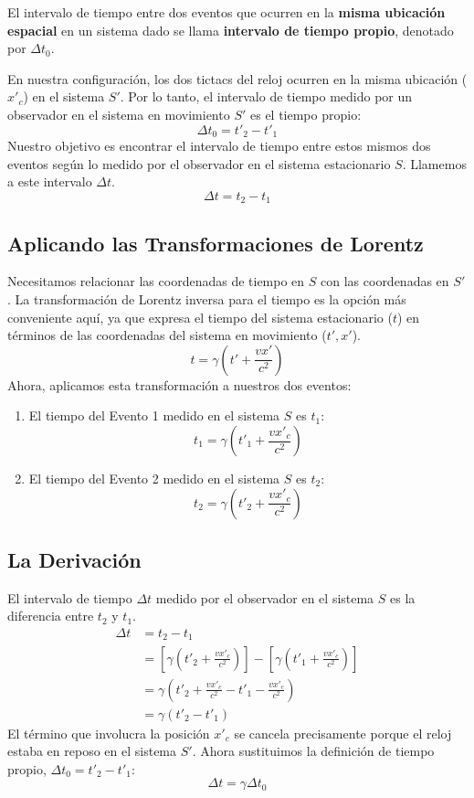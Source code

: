 \documentclass[11pt,a4paper]{article}
\begin{document}
El intervalo de tiempo entre dos eventos que ocurren en la \textbf{misma ubicación espacial} en un sistema dado se llama \textbf{intervalo de tiempo propio}, denotado por $\Delta t_0$.

En nuestra configuración, los dos tictacs del reloj ocurren en la misma ubicación ($x'_c$) en el sistema $S'$. Por lo tanto, el intervalo de tiempo medido por un observador en el sistema en movimiento $S'$ es el tiempo propio:
\[ \Delta t_0 = t'_2 - t'_1 \]
Nuestro objetivo es encontrar el intervalo de tiempo entre estos mismos dos eventos según lo medido por el observador en el sistema estacionario $S$. Llamemos a este intervalo $\Delta t$.
\[ \Delta t = t_2 - t_1 \]

\subsection{Aplicando las Transformaciones de Lorentz}

Necesitamos relacionar las coordenadas de tiempo en $S$ con las coordenadas en $S'$. La transformación de Lorentz inversa para el tiempo es la opción más conveniente aquí, ya que expresa el tiempo del sistema estacionario ($t$) en términos de las coordenadas del sistema en movimiento ($t', x'$).
\[ t = \gamma \left( t' + \frac{vx'}{c^2} \right) \]
Ahora, aplicamos esta transformación a nuestros dos eventos:
\begin{enumerate}
    \item El tiempo del Evento 1 medido en el sistema $S$ es $t_1$:
    \[ t_1 = \gamma \left( t'_1 + \frac{vx'_c}{c^2} \right) \]
    \item El tiempo del Evento 2 medido en el sistema $S$ es $t_2$:
    \[ t_2 = \gamma \left( t'_2 + \frac{vx'_c}{c^2} \right) \]
\end{enumerate}

\subsection{La Derivación}

El intervalo de tiempo $\Delta t$ medido por el observador en el sistema $S$ es la diferencia entre $t_2$ y $t_1$.
\begin{align*}
\Delta t &= t_2 - t_1 \\
&= \left[ \gamma \left( t'_2 + \frac{vx'_c}{c^2} \right) \right] - \left[ \gamma \left( t'_1 + \frac{vx'_c}{c^2} \right) \right] \\
&= \gamma \left( t'_2 + \frac{vx'_c}{c^2} - t'_1 - \frac{vx'_c}{c^2} \right) \\
&= \gamma (t'_2 - t'_1)
\end{align*}
El término que involucra la posición $x'_c$ se cancela precisamente porque el reloj estaba en reposo en el sistema $S'$. Ahora sustituimos la definición de tiempo propio, $\Delta t_0 = t'_2 - t'_1$:
\[ \Delta t = \gamma \Delta t_0 \]
\end{document}
